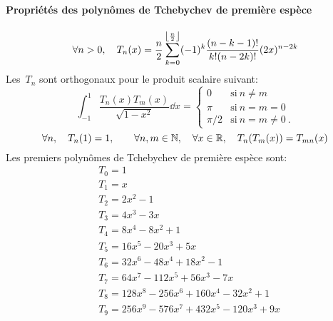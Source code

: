 \paragraph{Propriétés des polynômes de Tchebychev de première espèce} 
\begin{equation}
\forall n>0, \quad T_n(x)=\dfrac n2\displaystyle\sum_{k=0}^{\left\lfloor \frac n2\right\rfloor}(-1)^k \frac{(n-k-1)!}{k!(n-2k)!}(2x)^{n-2k} 
\end{equation}
Les~$T_n$ sont orthogonaux pour le produit scalaire suivant: 
\begin{equation}
 \int_{-1}^1 \frac{T_n(x)T_m(x)}{\sqrt{1-x^2}}\dd x= 
\begin{cases} 0&\text{si}~n\ne m\\ \pi&\text{si}~n=m=0\\ \pi/2&\text{si}~n=m\ne 0~. 
\end{cases} 
\end{equation}
\begin{equation}
\forall n, \quad T_n(1)=1,\qquad\forall n,m\in\mathbb N,\quad \forall x\in\mathbb R, \quad T_n(T_m(x))=T_{mn}(x) 
\end{equation}
Les premiers polynômes de Tchebychev de première espèce sont:
\begin{equation}
\begin{aligned}
&T_0 = 1 \\
&T_1 = x \\
&T_2 = 2x^2 - 1 \\
&T_3 = 4x^3 - 3x \\
& T_4 = 8x^4 - 8x^2 + 1 \\
& T_5 = 16x^5 - 20x^3 + 5x \\
& T_6 = 32x^6 - 48x^4 + 18x^2 - 1 \\
& T_7 = 64x^7 - 112x^5 + 56x^3 - 7x \\
& T_8 = 128x^8 - 256x^6 + 160x^4 - 32x^2 + 1 \\
&T_9 = 256x^9 - 576x^7 + 432x^5 - 120x^3 + 9x
\end{aligned}
\end{equation}
